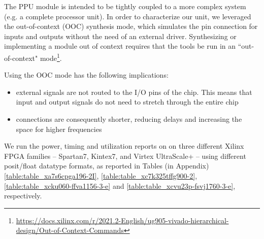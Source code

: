 The PPU module is intended to be tightly coupled to a more complex system (e.g. a complete processor unit). In order to characterize our unit, we leveraged the out-of-context (OOC) synthesis mode, which simulates the pin connection for inputs and outputs without the need of an external driver.
Synthesizing or implementing a module out of context requires that the tools be run in an ``out-of-context" mode\footnote{\url{https://docs.xilinx.com/r/2021.2-English/ug905-vivado-hierarchical-design/Out-of-Context-Commands}}.

Using the OOC mode has the following implications:
\begin{itemize}
\item external signals are not routed to the I/O pins of the chip. This means that input and output signals do not need to stretch through the entire chip
\item connections are consequently shorter, reducing delays and increasing the space for higher frequencies
\end{itemize}

We run the power, timing and utilization reports on on three different Xilinx FPGA families -- Spartan7, Kintex7, and Virtex UltraScale+ -- using different posit/float datatype formats, as reported in Tables (in Appendix) \ref{table:table_xa7s6cpga196-2I}, \ref{table:table_xc7k325tffg900-2}, \ref{table:table_xcku060-ffva1156-3-e} and \ref{table:table_xcvu23p-fsvj1760-3-e}, respectively.

